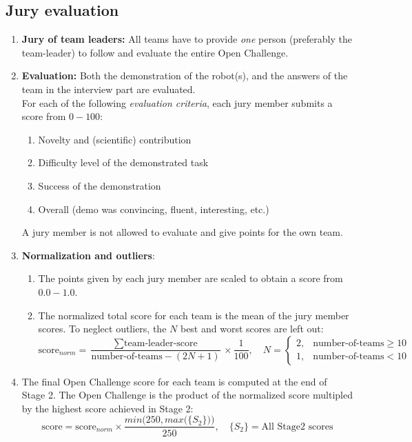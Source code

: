 \OpenDemonstrationChanges

\subsection{Jury evaluation}
\label{sec:test_open_challenge:scoring}
\begin{enumerate}
	\item \textbf{Jury of team leaders:} All teams have to provide \emph{one} person
	(preferably the team-leader) to follow and evaluate the entire Open Challenge.
	\item \textbf{Evaluation:} Both the demonstration of the robot(s), and the answers of the team in the interview part are evaluated.\\
	For each of the following \emph{evaluation criteria}, each jury member submits a score from $0-100$:
	\begin{enumerate}
	\item Novelty and (scientific) contribution
	\item Difficulty level of the demonstrated task
	\item Success of the demonstration
	\item Overall (demo was convincing, fluent, interesting, etc.)
	\end{enumerate}
	A jury member is not allowed to evaluate and give points for the own team.
	\item \textbf{Normalization and outliers}:
	\begin{enumerate}
		\item The points given by each jury member are scaled to obtain a score from $0.0-1.0$.
		\item The normalized total score for each team is the mean of the jury member scores.
			To neglect outliers, the $N$ best and worst scores are left out:
			$$\mbox{score}_{norm} = \frac{\sum\mbox{team-leader-score}}{\mbox{number-of-teams} - (2N+1)}\times\frac{1}{100},
			\quad N=\begin{cases}2, & \mbox{number-of-teams} \ge 10\\1, & \mbox{number-of-teams} < 10 \end{cases}$$
		\end{enumerate}
		\item The final Open Challenge score for each team is computed at the end of Stage 2. The Open Challenge  is the product of the normalized score multipled by the highest score achieved in Stage 2:
		$$\mbox{score} = \mbox{score}_{norm} \times \frac{min\Big(250, max\big(\{S_2\}\big)\Big)}{250},
		\quad \{S_2\}=\mbox{All Stage2 scores}
		$$
\end{enumerate}

